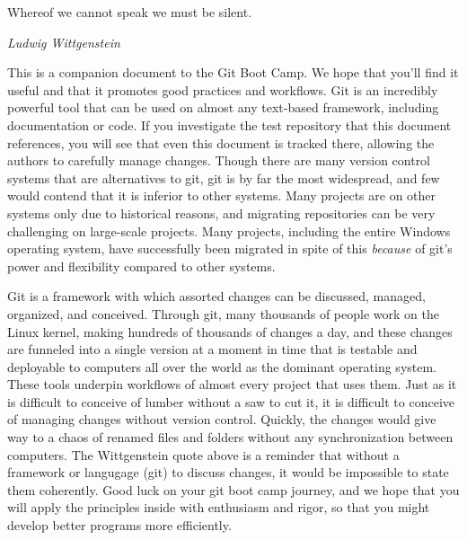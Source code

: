 \epigraph{Whereof we cannot speak we must be silent.}{\textit{Ludwig
Wittgenstein}}

\par{
This is a companion document to the Git Boot Camp. We hope that you'll find it
useful and that it promotes good practices and workflows. Git is an incredibly
powerful tool that can be used on almost any text-based framework, including
documentation or code. If you investigate the test repository that this
document references, you will see that even this document is tracked there,
allowing the authors to carefully manage changes. Though there are many
version control systems that are alternatives to git, git is by far the most
widespread, and few would contend that it is inferior to other systems. Many
projects are on other systems only due to historical reasons, and migrating
repositories can be very challenging on large-scale projects. 
Many projects, including the entire Windows operating system, have
successfully been migrated in spite of this \emph{because} of git's power and
flexibility compared to other systems.
}

\par{
Git is a framework with which assorted changes can be discussed, managed, 
organized, and conceived. Through git, many thousands of people work on the
Linux kernel, making hundreds of thousands of changes a day, and these changes
are funneled into a single version at a moment in time that is testable and
deployable to computers all over the world as the dominant operating system.
These tools underpin workflows of almost every project that uses them. Just as
it is difficult to conceive of lumber without a saw to cut it, it is difficult
to conceive of managing changes without version control. Quickly, the changes
would give way to a chaos of renamed files and folders without any
synchronization between computers. The Wittgenstein quote above is a reminder
that without a framework or langugage (git) to discuss changes, 
it would be impossible to state them coherently. 
Good luck on your git boot camp journey, and we hope
that you will apply the principles inside with enthusiasm and rigor, so that
you might develop better programs more efficiently. 
}
